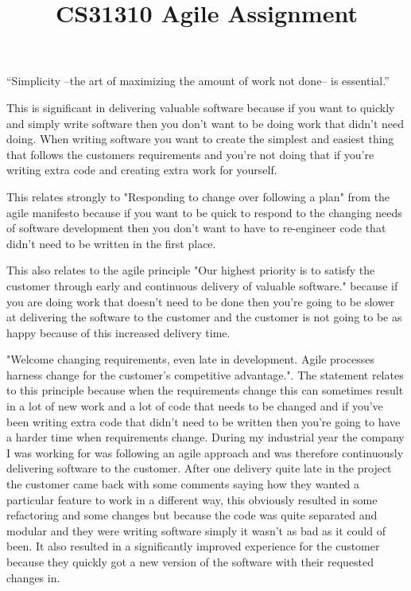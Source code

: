 \documentclass[10pt]{article}
\title {CS31310 Agile Assignment}
\begin{document}
\maketitle

“Simplicity --the art of maximizing the amount of work not done-- is essential.”

This is significant in delivering valuable software because if you want to quickly and simply write software then you don't want to be doing work that didn't need doing. When writing software you want to create the simplest and easiest thing that follows the customers requirements and you're not doing that if you're writing extra code and creating extra work for yourself.

This relates strongly to "Responding to change over following a plan" from the agile manifesto because if you want to be quick to respond to the changing needs of software development then you don't want to have to re-engineer code that didn't need to be written in the first place.

This also relates to the agile principle "Our highest priority is to satisfy the customer
through early and continuous delivery of valuable software." because if you are doing work that doesn't need to be done then you're going to be slower at delivering the software to the customer and the customer is not going to be as happy because of this increased delivery time.

"Welcome changing requirements, even late in development. Agile processes harness change for the customer's competitive advantage.". The statement relates to this principle because when the requirements change this can sometimes result in a lot of new work and a lot of code that needs to be changed and if you've been writing extra code that didn't need to be written then you're going to have a harder time when requirements change. During my industrial year the company I was working for was following an agile approach and was therefore continuously delivering software to the customer. After one delivery quite late in the project the customer came back with some comments saying how they wanted a particular feature to work in a different way, this obviously resulted in some refactoring and some changes but because the code was quite separated and modular and they were writing software simply it wasn't as bad as it could of been. It also resulted in a significantly improved experience for the customer because they quickly got a new version of the software with their requested changes in.
\end{document}

